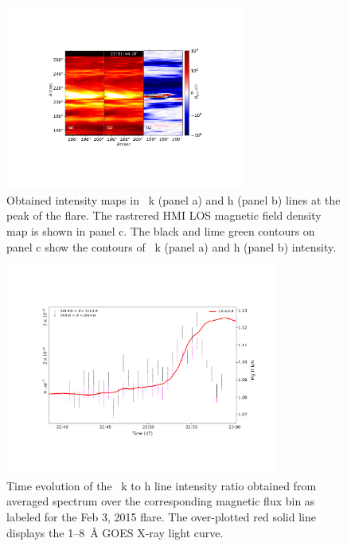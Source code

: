 \begin{figure}[ht!]
    \centering
\includegraphics[width=0.7\textwidth,trim={4cm 5cm 4cm 4cm},clip]{Figures/contour_paper_plot_feb-03-2015.pdf}
\caption[~h and k line intensity observation with artificially rastered HMI LOS magnetic field for the February 3rd, 2015 flare.]{Obtained intensity maps in  ~k (panel a) and h (panel b) lines at the peak of the flare. The rastrered HMI LOS magnetic field density map is shown in panel c. The black and lime green contours on panel c show the contours of  ~k (panel a) and h (panel b) intensity.}
\label{fig:align_raster_flare3}
\end{figure}

\begin{figure}[ht!]
    \centering
    \includegraphics[trim={2cm 3cm 2cm 3cm},clip,width=0.8\textwidth]{Figures/Feb-04-2015-optical-dep-ev-2.pdf}
    \caption[Time evolution of the ~k to h line intensity ratio obtained from averaged spectrum over the corresponding magnetic flux bin for the February 3rd, 2015 flare.]{Time evolution of the ~k to h line intensity ratio obtained from averaged spectrum over the corresponding magnetic flux bin as labeled for the Feb 3, 2015 flare. The over-plotted red solid line displays the 1{--}8~{\AA} GOES X-ray light curve.}
    \label{fig:optical_dep_ev_c}
\end{figure}

